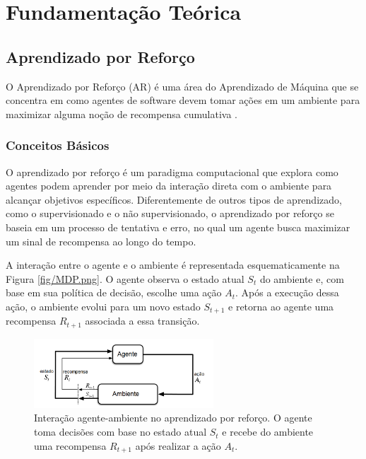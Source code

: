\chapter{Fundamentação Teórica}
\label{cap:fund}

\section{Aprendizado por Reforço}
\label{sec:rl}

O Aprendizado por Reforço (AR) é uma área do Aprendizado de Máquina que se concentra em como agentes de software devem tomar ações em um ambiente para maximizar alguma noção de recompensa cumulativa \cite{sutton}. 

\subsection{Conceitos Básicos}
\label{subsec:rl_conceitos}

O aprendizado por reforço é um paradigma computacional que explora como agentes podem aprender por meio da interação direta com o ambiente para alcançar objetivos específicos. Diferentemente de outros tipos de aprendizado, como o supervisionado e o não supervisionado, o aprendizado por reforço se baseia em um processo de tentativa e erro, no qual um agente busca maximizar um sinal de recompensa ao longo do tempo.

A interação entre o agente e o ambiente é representada esquematicamente na Figura \ref{fig/MDP.png}. O agente observa o estado atual \( S_t \) do ambiente e, com base em sua política de decisão, escolhe uma ação \( A_t \). Após a execução dessa ação, o ambiente evolui para um novo estado \( S_{t+1} \) e retorna ao agente uma recompensa \( R_{t+1} \) associada a essa transição.

\begin{figure}[h]
    \centering
    \includegraphics[width=0.6\textwidth]{fig/MDP.png}
    \caption{Interação agente-ambiente no aprendizado por reforço. O agente toma decisões com base no estado atual \( S_t \) e recebe do ambiente uma recompensa \( R_{t+1} \) após realizar a ação \( A_t \).}
    \label{fig:agent_env_interaction}
\end{figure}

